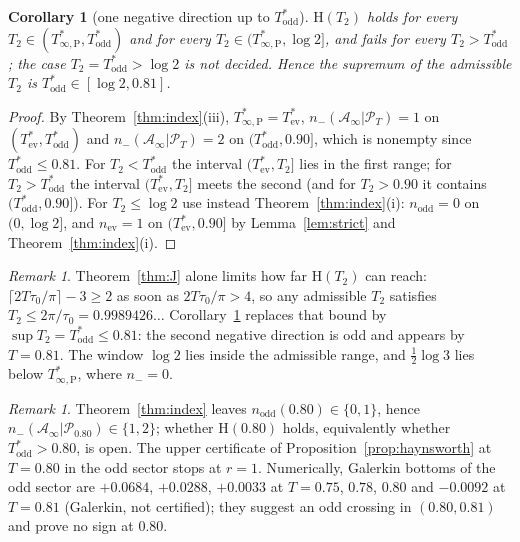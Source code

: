\documentclass[11pt]{amsart}
\newtheorem{corollary}[theorem]{Corollary}
\theoremstyle{definition}
\theoremstyle{remark}
\newtheorem{remark}[theorem]{Remark}
\newcommand{\PT}{\mathcal P_T}
\newcommand{\Ainf}{\mathcal A_\infty}
\begin{document}
\begin{corollary}[one negative direction up to $T^*_{\mathrm{odd}}$]\label{cor:H1}
$\mathrm H(T_2)$ holds for every $T_2\in(T^*_{\infty,\mathrm P},T^*_{\mathrm{odd}})$ and for every
$T_2\in(T^*_{\infty,\mathrm P},\log2]$, and fails for every $T_2>T^*_{\mathrm{odd}}$; the case
$T_2=T^*_{\mathrm{odd}}>\log2$ is not decided. Hence the supremum of the admissible $T_2$ is
$T^*_{\mathrm{odd}}\in[\log2,0.81]$.
\end{corollary}
\begin{proof}
By Theorem~\ref{thm:index}(iii), $T^*_{\infty,\mathrm P}=T^*_{\mathrm{ev}}$, $n_-(\Ainf|\PT)=1$ on
$(T^*_{\mathrm{ev}},T^*_{\mathrm{odd}})$ and $n_-(\Ainf|\PT)=2$ on $(T^*_{\mathrm{odd}},0.90]$, which is
nonempty since $T^*_{\mathrm{odd}}\le0.81$. For $T_2<T^*_{\mathrm{odd}}$ the interval
$(T^*_{\mathrm{ev}},T_2]$ lies in the first range; for $T_2>T^*_{\mathrm{odd}}$ the interval
$(T^*_{\mathrm{ev}},T_2]$ meets the second (and for $T_2>0.90$ it contains $(T^*_{\mathrm{odd}},0.90]$).
For $T_2\le\log2$ use instead Theorem~\ref{thm:index}(i): $n_{\mathrm{odd}}=0$ on $(0,\log2]$, and
$n_{\mathrm{ev}}=1$ on $(T^*_{\mathrm{ev}},0.90]$ by Lemma~\ref{lem:strict} and Theorem~\ref{thm:index}(i).
\end{proof}

\begin{remark}
Theorem~\ref{thm:J} alone limits how far $\mathrm H(T_2)$ can reach:
$\lceil2T\tau_0/\pi\rceil-3\ge2$ as soon as $2T\tau_0/\pi>4$, so any admissible $T_2$ satisfies
$T_2\le2\pi/\tau_0=0.9989426\ldots$ Corollary~\ref{cor:H1} replaces that bound by
$\sup T_2=T^*_{\mathrm{odd}}\le0.81$: the second negative direction is odd and appears by $T=0.81$.
The window $\log2$ lies inside the admissible range, and $\frac12\log3$ lies below
$T^*_{\infty,\mathrm P}$, where $n_-=0$.
\end{remark}

\begin{remark}\label{rem:odd080}
Theorem~\ref{thm:index} leaves $n_{\mathrm{odd}}(0.80)\in\{0,1\}$, hence $n_-(\Ainf|\mathcal P_{0.80})\in\{1,2\}$;
whether $\mathrm H(0.80)$ holds, equivalently whether $T^*_{\mathrm{odd}}>0.80$, is open. The upper
certificate of Proposition~\ref{prop:haynsworth} at $T=0.80$ in the odd sector stops at $r=1$.
Numerically, Galerkin bottoms of the odd sector are $+0.0684$, $+0.0288$, $+0.0033$ at $T=0.75$, $0.78$,
$0.80$ and $-0.0092$ at $T=0.81$ (Galerkin, not certified); they suggest an odd crossing in $(0.80,0.81)$
and prove no sign at $0.80$.
\end{remark}
\end{document}
